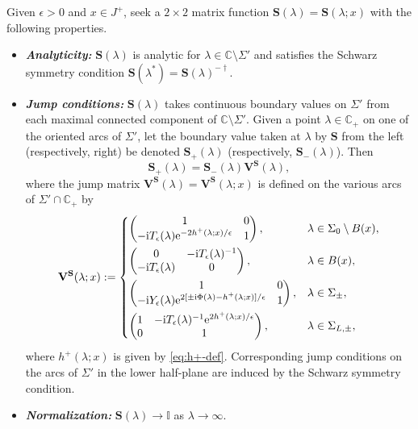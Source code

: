 \documentclass[12pt]{amsart}
\numberwithin{equation}{section}
\newcommand{\ee}{\mathrm{e}}
\newcommand{\ii}{\mathrm{i}}
\newcommand{\SP}{\lambda}
\newcommand{\phaseint}{\Phi}
\begin{document}
\begin{myrhp}
Given $\epsilon>0$ and $x \in J^+$, seek a $2\times 2$ matrix function $\mathbf{S}(\SP)=\mathbf{S}(\SP;x)$ with the following properties.
\begin{itemize}
\item[]\textit{\textbf{Analyticity:}}  $\mathbf{S}(\SP)$ is analytic for $\SP\in\mathbb{C}\setminus\Sigma'$ and satisfies the Schwarz symmetry condition $\mathbf{S}(\SP^*)=\mathbf{S}(\SP)^{-\dagger}$.
\item[]\textit{\textbf{Jump conditions:}} $\mathbf{S}(\SP)$ takes continuous boundary values on $\Sigma'$ from each maximal connected component of $\mathbb{C}\setminus\Sigma'$.  Given a point $\SP\in\mathbb{C}_+$ on one of the oriented arcs of $\Sigma'$, let the boundary value taken at $\SP$ by $\mathbf{S}$ from the left (respectively, right) be denoted $\mathbf{S}_+(\SP)$ (respectively, $\mathbf{S}_-(\SP)$).  Then 
\begin{equation}
\mathbf{S}_+(\SP)=\mathbf{S}_-(\SP)\mathbf{V^S}(\SP),
\end{equation}
where the jump matrix $\mathbf{V^S}(\SP)=\mathbf{V^S}(\SP;x)$ is defined on the various arcs of $\Sigma'\cap\mathbb{C}_+$ by 
\begin{equation}
\mathbf{V^S}(\SP;x):= \begin{dcases}
	\begin{pmatrix} 1 & 0 \\ -\ii T_\epsilon(\SP)\ee^{-2 h^+(\SP;x)/\epsilon} & 1 \end{pmatrix},
	 & \SP\in\Sigma_0 \setminus B(x), \\
	\begin{pmatrix}0 & -\ii T_\epsilon(\SP)^{-1} \\ -\ii T_\epsilon(\SP) & 0 \end{pmatrix}, 
 	 & \SP\in B(x), \\
	\begin{pmatrix} 1 & 0 \\ -\ii Y_\epsilon(\SP)\ee^{2[\pm\ii \phaseint(\SP)-h^+(\SP;x)]/\epsilon} & 1 \end{pmatrix}, 
	 &\SP\in\Sigma_\pm, \\
	\begin{pmatrix} 1 & -\ii T_\epsilon(\SP)^{-1}\ee^{2h^+(\SP;x)/\epsilon} \\ 0 & 1 \end{pmatrix},
	 &\SP \in \Sigma_{L,\pm}, \\
\end{dcases}
\label{eq:jump+++S}
\end{equation}
where $h^+(\SP;x)$ is given by \eqref{eq:h+-def}. 
Corresponding jump conditions on the arcs of $\Sigma'$ in the lower half-plane are induced by the Schwarz symmetry 
condition.
\item[]\textit{\textbf{Normalization:}} $\mathbf{S}(\SP)\to\mathbb{I}$ as $\SP\to\infty$.
\end{itemize}
\label{rhp:+++S}
\end{myrhp}
\end{document}

